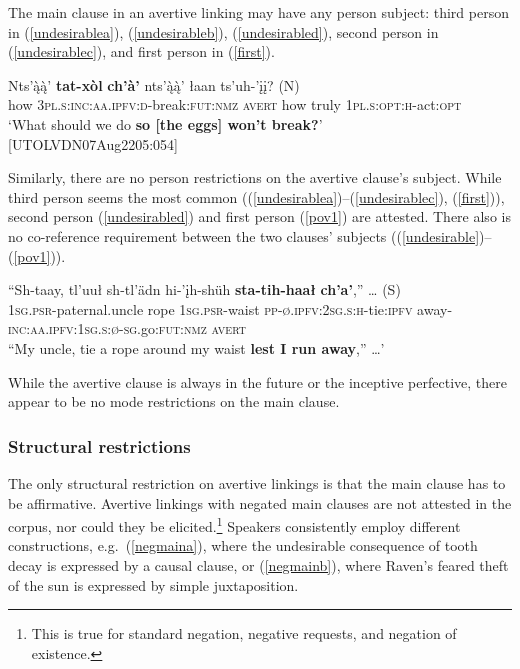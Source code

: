 \documentclass[output=paper,colorlinks,citecolor=brown
]{langscibook}
\begin{document}
The main clause in an avertive linking may have any person subject: third person in (\ref{undesirablea}), (\ref{undesirableb}), (\ref{undesirabled}), second person in (\ref{undesirablec}), and first person in (\ref{first}). 

\ea \label{first}
\gll Nts'ą̀ą̀' \textbf{tat-xòl} \textbf{ch'à'} nts'ą̀ą̀' łaan {ts'uh-'įį? \textnormal{(N)}} \\
how \textsc{3pl.s:inc:aa.ipfv:d}-break:\textsc{fut:nmz} \textsc{avert} how truly \textsc{1pl.s:opt:h}-act:\textsc{opt} \\
\glt `What should we do \textbf{so [the eggs] won't break?}' \\ \hfill [UTOLVDN07Aug2205:054]
\z

Similarly, there are no person restrictions on the avertive clause's subject. While third person seems the most common ((\ref{undesirablea})--(\ref{undesirablec}), (\ref{first})), second person (\ref{undesirabled}) and first person (\ref{pov1}) are attested. There also is no co-reference requirement between the two clauses' subjects ((\ref{undesirable})--(\ref{pov1})).

\ea \label{pov1}
\gll ``Sh-taay, tl'uuł  sh-tl'ädn hi-'įh-shüh \textbf{sta-tih-haał} \textbf{ch'a'},''  {\ldots} \textnormal{(S})\\
\textsc{1sg.psr}-paternal.uncle rope \textsc{1sg.psr}-waist \textsc{pp-ø.ipfv:2sg.s:h}-tie:\textsc{ipfv} away-\textsc{inc:aa.ipfv:1sg.s:ø-sg}.go:\textsc{fut:nmz} \textsc{avert} \\
``My uncle, tie a rope around my waist \textbf{lest I run away},'' \ldots'\\ \hfill \citep[26]{TyoneM1996}
\z

While the avertive clause is always in the future or the inceptive perfective, there appear to be no mode restrictions on the main clause. 


\subsubsection{Structural restrictions}
\label{subsubsection:avertive-struct-restr}

The only structural restriction on avertive linkings is that the main clause has to be affirmative. Avertive linkings with negated main clauses are not attested in the corpus, nor could they be elicited.\footnote{This is true for standard negation, negative requests, and negation of existence.} Speakers consistently employ different constructions, e.g.\  (\ref{negmaina}), where the undesirable consequence of tooth decay is expressed by a causal clause, or (\ref{negmainb}), where Raven's feared theft of the sun is expressed by simple juxtaposition.
\end{document}
